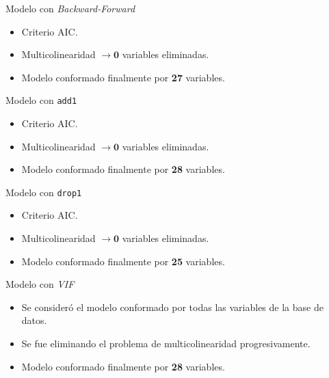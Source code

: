 \documentclass[11pt]{beamer}
\newcommand{\cod}[1]{\texttt{\frenchspacing#1}}
\begin{document}
\begin{frame}{Modelo con \textit{Backward-Forward}}
	\begin{itemize}
		\item Criterio AIC.
		\item Multicolinearidad $\to \mathbf{0}$ variables eliminadas.
		\item Modelo conformado finalmente por \textbf{27} variables.
	\end{itemize}
\end{frame}

\begin{frame}{Modelo con \cod{add1}}
	\begin{itemize}
		\item Criterio AIC.
		\item Multicolinearidad $\to \mathbf{0}$ variables eliminadas.
		\item Modelo conformado finalmente por \textbf{28} variables.
	\end{itemize}
\end{frame}

\begin{frame}{Modelo con \cod{drop1}}
	\begin{itemize}
		\item Criterio AIC.
		\item Multicolinearidad $\to \mathbf{0}$ variables eliminadas.
		\item Modelo conformado finalmente por \textbf{25} variables.
	\end{itemize}
\end{frame}

\begin{frame}{Modelo con \textit{VIF}}
	\begin{itemize}
		\item Se consideró el modelo conformado por todas las variables de la base de datos.
		\item Se fue eliminando el problema de multicolinearidad progresivamente.
		\item Modelo conformado finalmente por \textbf{28} variables.
	\end{itemize}
\end{frame}
\end{document}

